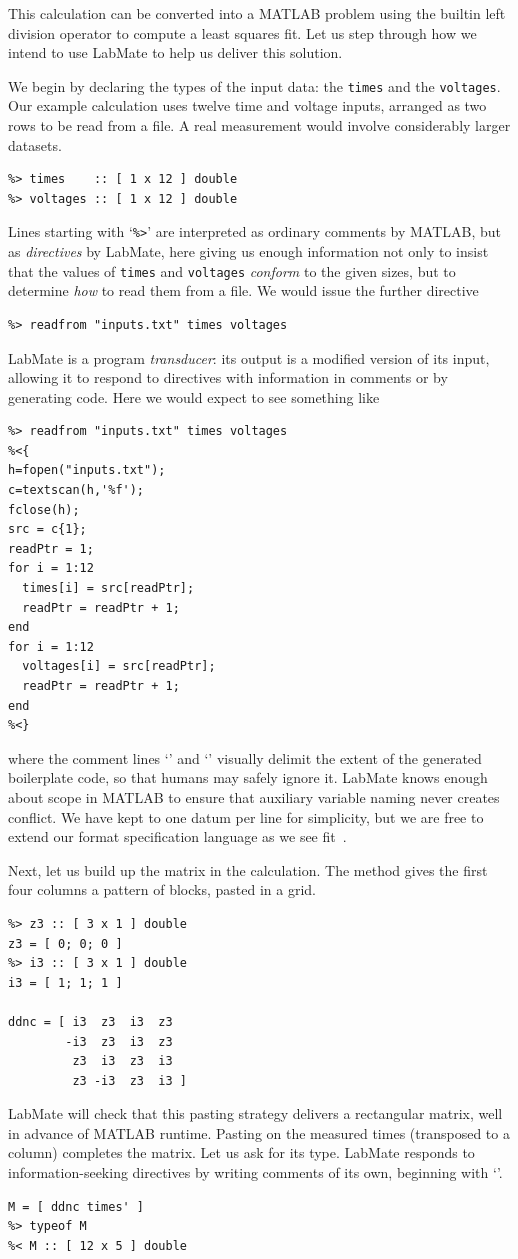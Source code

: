 \documentclass{IMEKO2024}
\newcommand{\pct}{\texttt{\symbol{37}}}
\newcommand{\res}{\texttt{\symbol{60}}}
\newcommand{\lcb}{\texttt{\symbol{123}}}
\newcommand{\rcb}{\texttt{\symbol{125}}}
\newcommand{\bsl}{\texttt{\symbol{92}}}
\newcommand{\remph}{\emph}
\begin{document}
This calculation can be converted into a MATLAB problem using the
builtin left division operator {\bsl} to compute a
least squares fit. Let us step through how we intend to use LabMate to
help us deliver this solution.

We begin by declaring the types of the input data: the \texttt{times} and the \texttt{voltages}. Our example calculation uses twelve time and voltage inputs, arranged as two rows to be read from a file. A real measurement would involve considerably larger datasets.
\begin{verbatim}
%> times    :: [ 1 x 12 ] double
%> voltages :: [ 1 x 12 ] double
\end{verbatim}
Lines starting with `\texttt{\%>}' are interpreted as ordinary comments by MATLAB, but as \remph{directives} by LabMate, here giving us enough information not only to insist that the values of \texttt{times} and \texttt{voltages} \remph{conform} to the given sizes, but to determine \remph{how} to read them from a file. We would issue the further directive
\begin{verbatim}
%> readfrom "inputs.txt" times voltages
\end{verbatim}
LabMate is a program \remph{transducer}: its output is a modified version of its input, allowing it to respond to directives with information in comments or by generating code. Here we would expect to see something like
\begin{verbatim}
%> readfrom "inputs.txt" times voltages
%<{
h=fopen("inputs.txt");
c=textscan(h,'%f');
fclose(h);
src = c{1};
readPtr = 1;
for i = 1:12
  times[i] = src[readPtr];
  readPtr = readPtr + 1;
end
for i = 1:12
  voltages[i] = src[readPtr];
  readPtr = readPtr + 1;
end
%<}
\end{verbatim}
where the comment lines `\pct\res\lcb' and `\pct\res\rcb' visually delimit the extent of the generated boilerplate code, so that humans may safely ignore it. LabMate knows enough about scope in MATLAB to ensure that auxiliary variable naming never creates conflict. We have kept to one datum per line for simplicity, but we are free to extend our format specification language as we see fit~\cite{mgen}.

Next, let us build up the matrix in the calculation. The method gives the first four columns a pattern of blocks, pasted in a grid.
\begin{verbatim}
%> z3 :: [ 3 x 1 ] double
z3 = [ 0; 0; 0 ]
%> i3 :: [ 3 x 1 ] double
i3 = [ 1; 1; 1 ]

ddnc = [ i3  z3  i3  z3
        -i3  z3  i3  z3
         z3  i3  z3  i3
         z3 -i3  z3  i3 ]
\end{verbatim}
LabMate will check that this pasting strategy delivers a rectangular matrix, well in advance of MATLAB runtime. Pasting on the measured times (transposed to a column) completes the matrix. Let us ask for its type. LabMate responds to information-seeking directives by writing comments of its own, beginning with `\pct\res'.
\begin{verbatim}
M = [ ddnc times' ]
%> typeof M
%< M :: [ 12 x 5 ] double
\end{verbatim}
\end{document}
